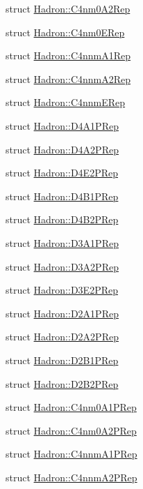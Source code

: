 \begin{DoxyCompactItemize}
struct \mbox{\hyperlink{structHadron_1_1C4nm0A2Rep}{Hadron\+::\+C4nm0\+A2\+Rep}}
\item 
struct \mbox{\hyperlink{structHadron_1_1C4nm0ERep}{Hadron\+::\+C4nm0\+E\+Rep}}
\item 
struct \mbox{\hyperlink{structHadron_1_1C4nnmA1Rep}{Hadron\+::\+C4nnm\+A1\+Rep}}
\item 
struct \mbox{\hyperlink{structHadron_1_1C4nnmA2Rep}{Hadron\+::\+C4nnm\+A2\+Rep}}
\item 
struct \mbox{\hyperlink{structHadron_1_1C4nnmERep}{Hadron\+::\+C4nnm\+E\+Rep}}
\item 
struct \mbox{\hyperlink{structHadron_1_1D4A1PRep}{Hadron\+::\+D4\+A1\+P\+Rep}}
\item 
struct \mbox{\hyperlink{structHadron_1_1D4A2PRep}{Hadron\+::\+D4\+A2\+P\+Rep}}
\item 
struct \mbox{\hyperlink{structHadron_1_1D4E2PRep}{Hadron\+::\+D4\+E2\+P\+Rep}}
\item 
struct \mbox{\hyperlink{structHadron_1_1D4B1PRep}{Hadron\+::\+D4\+B1\+P\+Rep}}
\item 
struct \mbox{\hyperlink{structHadron_1_1D4B2PRep}{Hadron\+::\+D4\+B2\+P\+Rep}}
\item 
struct \mbox{\hyperlink{structHadron_1_1D3A1PRep}{Hadron\+::\+D3\+A1\+P\+Rep}}
\item 
struct \mbox{\hyperlink{structHadron_1_1D3A2PRep}{Hadron\+::\+D3\+A2\+P\+Rep}}
\item 
struct \mbox{\hyperlink{structHadron_1_1D3E2PRep}{Hadron\+::\+D3\+E2\+P\+Rep}}
\item 
struct \mbox{\hyperlink{structHadron_1_1D2A1PRep}{Hadron\+::\+D2\+A1\+P\+Rep}}
\item 
struct \mbox{\hyperlink{structHadron_1_1D2A2PRep}{Hadron\+::\+D2\+A2\+P\+Rep}}
\item 
struct \mbox{\hyperlink{structHadron_1_1D2B1PRep}{Hadron\+::\+D2\+B1\+P\+Rep}}
\item 
struct \mbox{\hyperlink{structHadron_1_1D2B2PRep}{Hadron\+::\+D2\+B2\+P\+Rep}}
\item 
struct \mbox{\hyperlink{structHadron_1_1C4nm0A1PRep}{Hadron\+::\+C4nm0\+A1\+P\+Rep}}
\item 
struct \mbox{\hyperlink{structHadron_1_1C4nm0A2PRep}{Hadron\+::\+C4nm0\+A2\+P\+Rep}}
\item 
struct \mbox{\hyperlink{structHadron_1_1C4nnmA1PRep}{Hadron\+::\+C4nnm\+A1\+P\+Rep}}
\item 
struct \mbox{\hyperlink{structHadron_1_1C4nnmA2PRep}{Hadron\+::\+C4nnm\+A2\+P\+Rep}}

\end{DoxyCompactItemize}
